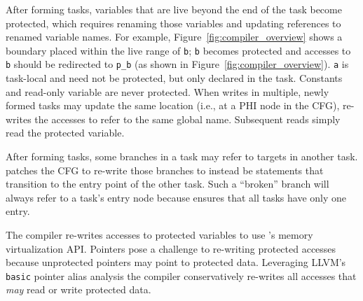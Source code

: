 After forming tasks, variables that are live beyond the end of the task become protected, which requires renaming those variables and updating references to renamed variable names. For example, Figure~\ref{fig:compiler_overview} shows a boundary placed within the live range of {\tt b}; {\tt b} becomes protected and accesses to {\tt b} should be redirected to {\tt p\_b} (as shown in Figure~\ref{fig:compiler_overview}). {\tt a} is task-local and need not be protected, but only declared in the task. Constants and read-only variable are never protected. When writes in multiple, newly formed tasks may update the same location (i.e., at a PHI node in the CFG), \sys re-writes the accesses to refer to the same global name. Subsequent reads simply read the protected variable.

After forming tasks, some branches in a task may refer to targets in another task. \sys patches the CFG to re-write those branches to instead be \transition statements that transition to the entry point of the other task. Such a ``broken'' branch will always refer to a task's entry node because \sys ensures that all tasks have only one entry. 

The compiler re-writes accesses to protected variables to use \sys's memory virtualization API. Pointers pose a challenge to re-writing protected accesses because unprotected pointers may point to protected data. Leveraging LLVM's {\tt basic} pointer alias analysis the compiler conservatively re-writes all accesses that {\em may} read or write protected data. 


